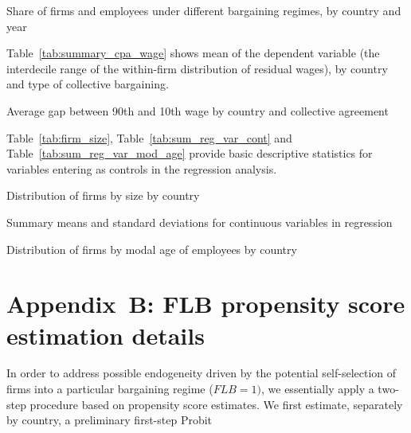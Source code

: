 \documentclass[12pt]{article}
\begin{document}
\begin{table}[hbp]
\centering
\caption{Share of firms and employees under different bargaining regimes, by country and year}
\label{tab:summary_stats}

\end{table}


Table~\ref{tab:summary_cpa_wage} shows mean of the dependent variable (the interdecile range of the within-firm distribution of residual wages), by country and type of collective bargaining.
\begin{table}[tb]
\caption{Average gap between 90th and 10th wage by country and collective agreement}
\label{tab:summary_cpa_wage}
\centering

\end{table}

\bigskip

Table~\ref{tab:firm_size}, Table~\ref{tab:sum_reg_var_cont} and Table~\ref{tab:sum_reg_var_mod_age} provide basic descriptive statistics for variables entering as controls in the regression analysis.

\begin{table}[ht]
\centering
\small
\caption{Distribution of firms by size by country}
\label{tab:firm_size}

\end{table}

\begin{table}[htp]
\caption{Summary means and standard deviations for continuous variables in regression}
\label{tab:sum_reg_var_cont}
\centering
\small

\end{table}

\begin{table}[ht]
\caption{Distribution of firms by modal age of employees by country}
\label{tab:sum_reg_var_mod_age}
\centering
\small

\end{table}


\clearpage

\section*{Appendix~B: FLB propensity score estimation details}

In order to address possible endogeneity driven by the potential self-selection of firms into a particular bargaining regime ($\mathit{FLB}=1)$, we essentially apply a two-step procedure based on propensity score estimates. We first estimate, separately by country, a preliminary first-step Probit
\end{document}
